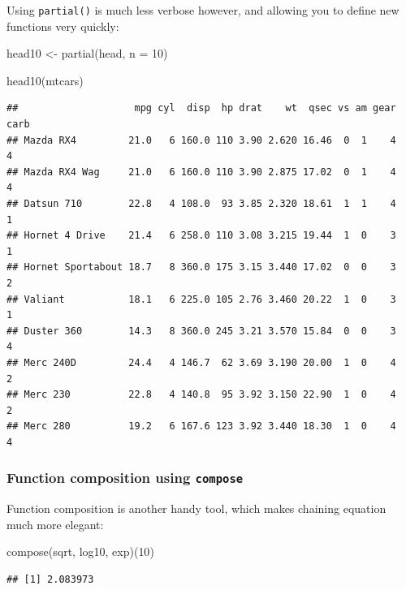 \documentclass[
]{article}
\newenvironment{Shaded}{\begin{snugshade}}{\end{snugshade}}
\newcommand{\AttributeTok}[1]{\textcolor[rgb]{0.77,0.63,0.00}{#1}}
\newcommand{\DecValTok}[1]{\textcolor[rgb]{0.00,0.00,0.81}{#1}}
\newcommand{\FunctionTok}[1]{\textcolor[rgb]{0.00,0.00,0.00}{#1}}
\newcommand{\NormalTok}[1]{#1}
\newcommand{\OtherTok}[1]{\textcolor[rgb]{0.56,0.35,0.01}{#1}}
\begin{document}
Using \texttt{partial()} is much less verbose however, and allowing you to define new functions very quickly:

\begin{Shaded}
\begin{Highlighting}[]
\NormalTok{head10 }\OtherTok{\textless{}{-}} \FunctionTok{partial}\NormalTok{(head, }\AttributeTok{n =} \DecValTok{10}\NormalTok{)}

\FunctionTok{head10}\NormalTok{(mtcars)}
\end{Highlighting}
\end{Shaded}

\begin{verbatim}
##                    mpg cyl  disp  hp drat    wt  qsec vs am gear carb
## Mazda RX4         21.0   6 160.0 110 3.90 2.620 16.46  0  1    4    4
## Mazda RX4 Wag     21.0   6 160.0 110 3.90 2.875 17.02  0  1    4    4
## Datsun 710        22.8   4 108.0  93 3.85 2.320 18.61  1  1    4    1
## Hornet 4 Drive    21.4   6 258.0 110 3.08 3.215 19.44  1  0    3    1
## Hornet Sportabout 18.7   8 360.0 175 3.15 3.440 17.02  0  0    3    2
## Valiant           18.1   6 225.0 105 2.76 3.460 20.22  1  0    3    1
## Duster 360        14.3   8 360.0 245 3.21 3.570 15.84  0  0    3    4
## Merc 240D         24.4   4 146.7  62 3.69 3.190 20.00  1  0    4    2
## Merc 230          22.8   4 140.8  95 3.92 3.150 22.90  1  0    4    2
## Merc 280          19.2   6 167.6 123 3.92 3.440 18.30  1  0    4    4
\end{verbatim}

\hypertarget{function-composition-using-compose}{%
\subsubsection{\texorpdfstring{Function composition using \texttt{compose}}{Function composition using compose}}\label{function-composition-using-compose}}

Function composition is another handy tool, which makes chaining equation much more elegant:

\begin{Shaded}
\begin{Highlighting}[]
\FunctionTok{compose}\NormalTok{(sqrt, log10, exp)(}\DecValTok{10}\NormalTok{)}
\end{Highlighting}
\end{Shaded}

\begin{verbatim}
## [1] 2.083973
\end{verbatim}
\end{document}
